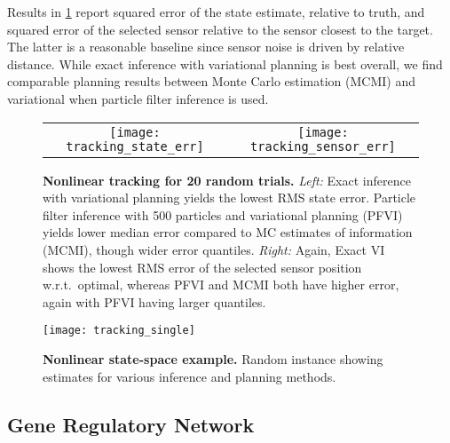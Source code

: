 Results in \FIG\ref{fig:dynamic} report squared error of the state
estimate, relative to truth, and squared error of the selected sensor
relative to the sensor closest to the target.  The latter is
a reasonable baseline since sensor noise is driven by relative
distance.  While exact inference with variational planning is best
overall, we find comparable planning results between Monte Carlo
estimation (MCMI) and variational when particle filter inference is
used.

\begin{figure}
  \begin{tabular}{cc}
    \hspace{-3mm}\texttt{[image: tracking\_state\_err]} &
    \hspace{-3mm}\texttt{[image: tracking\_sensor\_err]}
  \end{tabular}
  
  \caption{\small\textbf{Nonlinear tracking for 20 random
  trials.}  \emph{Left:} Exact inference with variational planning
  yields the lowest RMS state error.  Particle filter inference with
  500 particles and variational planning (PFVI) yields lower median
  error compared to MC estimates of information (MCMI), though wider
  error quantiles.  \emph{Right:} Again, Exact VI shows the lowest RMS
  error of the selected sensor position w.r.t.~optimal, whereas PFVI
  and MCMI both have higher error, again with PFVI having larger
  quantiles.}
  \label{fig:dynamic}
\end{figure}


\begin{figure*}[!t]
  \centering
  \hspace{-3mm}
  \texttt{[image: tracking\_single]}
  \vspace{-3mm}
  \caption{\small\textbf{Nonlinear state-space example.} Random instance
    showing estimates for various inference and planning methods.}
  \label{fig:ep}
\end{figure*}



\subsection{Gene Regulatory Network}

